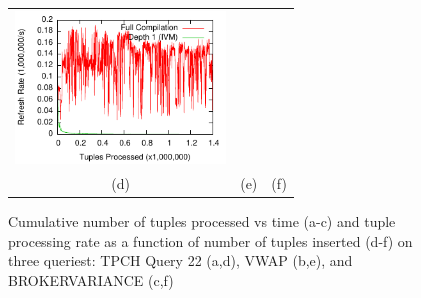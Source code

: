 \begin{figure}
\begin{center}
\begin{tabular}{ccc}
\includegraphics[width=2.2in]{../graphs/graphs/windowedrate_brokervariance.pdf} \\
(d) & (e) & (f) \\
\end{tabular}
\caption{Cumulative number of tuples processed vs time (a-c) and tuple processing rate as a function of number of tuples inserted (d-f) on three queriest: TPCH Query 22 (a,d), VWAP (b,e), and BROKERVARIANCE (c,f)}
\label{fig:experiments:nestedgood}
\end{center}
\end{figure}


